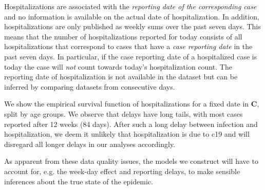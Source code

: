Hospitalizations are associated with the \emph{reporting date of the corresponding case} and no information is available on the actual date of hospitalization. In addition, hospitalizations are only published as weekly sums over the past seven days. This means that the number of hospitalizations reported for today consists of all hospitalizations that correspond to cases that have a \emph{case reporting date} in the past seven days. In particular, if the case reporting date of a hospitalized case is today the case will \emph{not} count towards today's hospitalization count. The reporting date of hospitalization is not available in the dataset but can be inferred by comparing datasets from consecutive days.

We show the empirical survival function of hospitalizations for a fixed date in  \textbf{C}, split by age groups. We observe that delays have long tails, with most cases reported after 12 weeks (84 days). After such a long delay between infection and hospitalization, we deem it unlikely that hospitalization is due to \acrshort{c19} and will disregard all longer delays in our analyses accordingly. 



As apparent from these data quality issues, the models we construct will have to account for, e.g. the week-day effect and reporting delays, to make sensible inferences about the true state of the epidemic. 